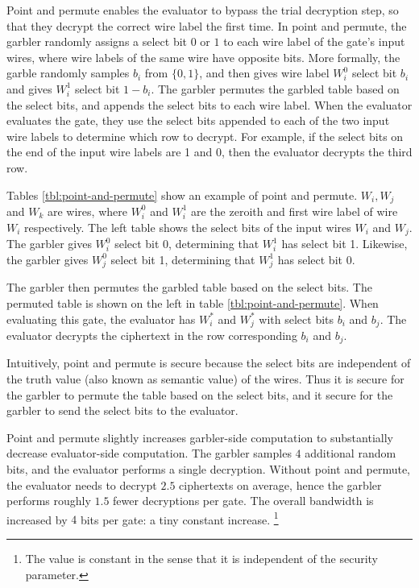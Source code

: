 Point and permute enables the evaluator to bypass the trial decryption step, so that they decrypt the correct wire label the first time.
In point and permute, the garbler randomly assigns a select bit $0$ or $1$ to each wire label of the gate's input wires, where wire labels of the same wire have opposite bits.
More formally, the garble randomly samples $b_i$ from $\{0,1\}$, and then gives wire label $W_i^0$ select bit $b_i$ and gives $W_i^1$ select bit $1-b_i$.
The garbler permutes the garbled table based on the select bits, and appends the select bits to each wire label.
When the evaluator evaluates the gate, they use the select bits appended to each of the two input wire labels to determine which row to decrypt.
For example, if the select bits on the end of the input wire labels are 1 and 0, then the evaluator decrypts the third row.

Tables \ref{tbl:point-and-permute} show an example of point and permute.
$W_i, W_j$ and $W_k$ are wires, where $W_i^0$ and $W_i^1$ are the zeroith and first wire label of wire $W_i$ respectively.
The left table shows the select bits of the input wires $W_i$ and $W_j$.
The garbler gives $W_i^0$ select bit 0, determining that $W_i^1$ has select bit 1.
Likewise, the garbler gives $W_j^0$ select bit 1, determining that $W_j^1$ has select bit 0.

The garbler then permutes the garbled table based on the select bits. 
The permuted table is shown on the left in table \ref{tbl:point-and-permute}.
When evaluating this gate, the evaluator has $W_i^*$ and $W_j^*$ with select bits $b_i$ and $b_j$.
The evaluator decrypts the ciphertext in the row corresponding $b_i$ and $b_j$.

Intuitively, point and permute is secure because the select bits are independent of the truth value (also known as semantic value) of the wires.
Thus it is secure for the garbler to permute the table based on the select bits, and it secure for the garbler to send the select bits to the evaluator.

Point and permute slightly increases garbler-side computation to substantially decrease evaluator-side computation.
The garbler samples $4$ additional random bits, and the evaluator performs a single decryption.
Without point and permute, the evaluator needs to decrypt $2.5$ ciphertexts on average, hence the garbler performs roughly $1.5$ fewer decryptions per gate.
The overall bandwidth is increased by $4$ bits per gate: a tiny constant increase. \footnote{The value is constant in the sense that it is independent of the security parameter.}


